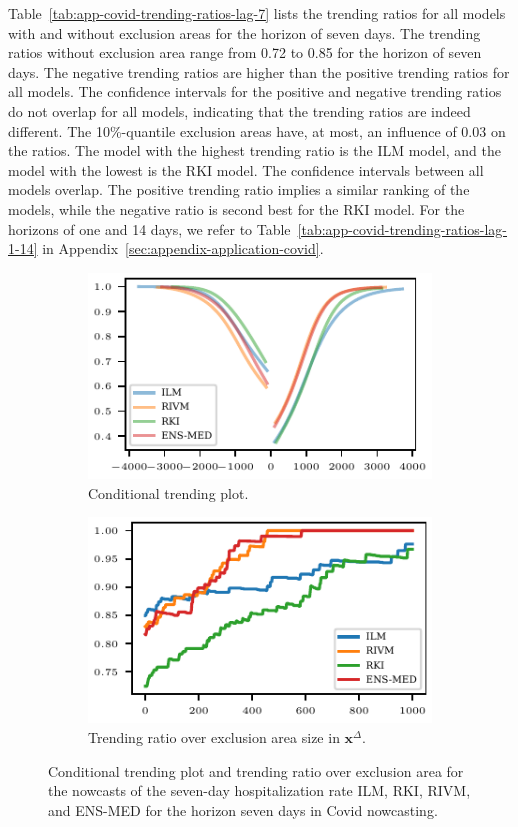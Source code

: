\documentclass[pdflatex]{sn-jnl}
\theoremstyle{plain}%
\theoremstyle{definition}
\newcommand{\diffx}{\mathbf{x}^{\Delta}}
\begin{document}
Table~\ref{tab:app-covid-trending-ratios-lag-7} lists the trending ratios for all models with and without exclusion areas for the horizon of seven days.
The trending ratios without exclusion area range from 0.72 to 0.85 for the horizon of seven days.
The negative trending ratios are higher than the positive trending ratios for all models.
The confidence intervals for the positive and negative trending ratios do not overlap for all models, indicating that the trending ratios are indeed different.
The 10\%-quantile exclusion areas have, at most, an influence of 0.03 on the ratios.
The model with the highest trending ratio is the ILM model, and the model with the lowest is the RKI model.
The confidence intervals between all models overlap.
The positive trending ratio implies a similar ranking of the models, while the negative ratio is second best for the RKI model.
For the horizons of one and 14 days, we refer to Table~\ref{tab:app-covid-trending-ratios-lag-1-14} in Appendix~\ref{sec:appendix-application-covid}.

\begin{figure}
    \centering
    \begin{subfigure}[t]{.48\textwidth}
    \includegraphics{plots/covid_nowcast/40_cond_prob_lag_7}
    \caption{Conditional trending plot.}\label{fig:app-covid-cond-prob-7}
    \end{subfigure}\hfill
    \begin{subfigure}[t]{.48\textwidth}
    \includegraphics{plots/covid_nowcast/40_acc_eps_lag_7}
    \caption{Trending ratio over exclusion area size in $\diffx$.}\label{fig:app-covid-trending-ratio-7}
    \end{subfigure}
    \caption[Conditional trending plot and trending ratio over exclusion area for the Covid nowcasts.]{Conditional trending plot and trending ratio over exclusion area for the nowcasts of the seven-day hospitalization rate ILM, RKI, RIVM, and ENS-MED for the horizon seven days in Covid nowcasting.}
    \label{fig:app-covid-cond-prob-trending-ratio-7}
\end{figure}
\end{document}
